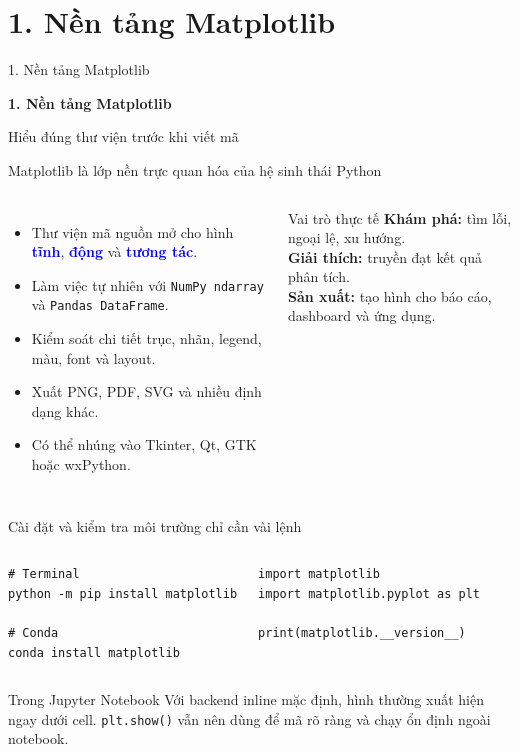 \documentclass[aspectratio=169,12pt]{beamer}
\newcommand{\key}[1]{\textcolor{Blue}{\textbf{#1}}}
\newenvironment{tightitems}{\begin{itemize}\setlength\itemsep{5pt}}{\end{itemize}}
\newcommand{\SectionSlide}[2]{
\section{#1}
\begin{frame}{#1}
  \vfill
  \centering
  {\usebeamercolor[fg]{structure}\fontsize{24}{29}\selectfont\bfseries #1\par}
  \vspace{5mm}
  {\large #2\par}
  \vfill
\end{frame}}
\begin{document}
\SectionSlide{1. Nền tảng Matplotlib}{Hiểu đúng thư viện trước khi viết mã}

\begin{frame}{Matplotlib là lớp nền trực quan hóa của hệ sinh thái Python}
\begin{columns}[T,onlytextwidth]
\begin{tightitems}
  \item Thư viện mã nguồn mở cho hình \key{tĩnh}, \key{động} và \key{tương tác}.
  \item Làm việc tự nhiên với \texttt{NumPy ndarray} và \texttt{Pandas DataFrame}.
  \item Kiểm soát chi tiết trục, nhãn, legend, màu, font và layout.
  \item Xuất PNG, PDF, SVG và nhiều định dạng khác.
  \item Có thể nhúng vào Tkinter, Qt, GTK hoặc wxPython.
\end{tightitems}
\begin{block}{Vai trò thực tế}
\textbf{Khám phá:} tìm lỗi, ngoại lệ, xu hướng.\\[2mm]
\textbf{Giải thích:} truyền đạt kết quả phân tích.\\[2mm]
\textbf{Sản xuất:} tạo hình cho báo cáo, dashboard và ứng dụng.
\end{block}
\end{columns}
\end{frame}

\begin{frame}[fragile]{Cài đặt và kiểm tra môi trường chỉ cần vài lệnh}
\begin{columns}[T,onlytextwidth]
\begin{lstlisting}[style=py,numbers=none]
# Terminal
python -m pip install matplotlib

# Conda
conda install matplotlib
\end{lstlisting}
\begin{lstlisting}[style=py]
import matplotlib
import matplotlib.pyplot as plt

print(matplotlib.__version__)
\end{lstlisting}
\end{columns}
\vspace{3mm}
\begin{block}{Trong Jupyter Notebook}
Với backend inline mặc định, hình thường xuất hiện ngay dưới cell. \texttt{plt.show()} vẫn nên dùng để mã rõ ràng và chạy ổn định ngoài notebook.
\end{block}
\end{frame}
\end{document}
